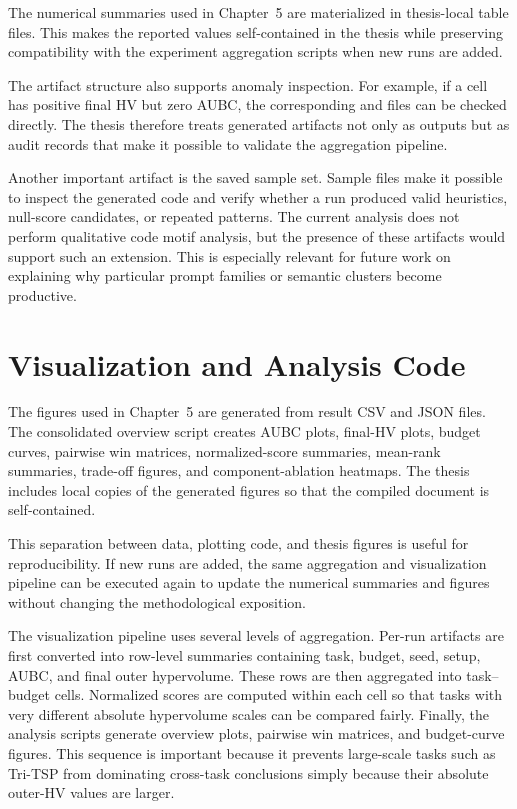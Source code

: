 \documentclass[../main.tex]{subfiles}
\begin{document}
The numerical summaries used in Chapter~5 are materialized in thesis-local table files. This makes the reported values self-contained in the thesis while preserving compatibility with the experiment aggregation scripts when new runs are added.

The artifact structure also supports anomaly inspection. For example, if a cell has positive final HV but zero AUBC, the corresponding  and  files can be checked directly. The thesis therefore treats generated artifacts not only as outputs but as audit records that make it possible to validate the aggregation pipeline.

Another important artifact is the saved sample set. Sample files make it possible to inspect the generated code and verify whether a run produced valid heuristics, null-score candidates, or repeated patterns. The current analysis does not perform qualitative code motif analysis, but the presence of these artifacts would support such an extension. This is especially relevant for future work on explaining why particular prompt families or semantic clusters become productive.

\section{Visualization and Analysis Code}

The figures used in Chapter~5 are generated from result CSV and JSON files. The consolidated overview script creates AUBC plots, final-HV plots, budget curves, pairwise win matrices, normalized-score summaries, mean-rank summaries, trade-off figures, and component-ablation heatmaps. The thesis includes local copies of the generated figures so that the compiled document is self-contained.

This separation between data, plotting code, and thesis figures is useful for reproducibility. If new runs are added, the same aggregation and visualization pipeline can be executed again to update the numerical summaries and figures without changing the methodological exposition.

The visualization pipeline uses several levels of aggregation. Per-run artifacts are first converted into row-level summaries containing task, budget, seed, setup, AUBC, and final outer hypervolume. These rows are then aggregated into task--budget cells. Normalized scores are computed within each cell so that tasks with very different absolute hypervolume scales can be compared fairly. Finally, the analysis scripts generate overview plots, pairwise win matrices, and budget-curve figures. This sequence is important because it prevents large-scale tasks such as Tri-TSP from dominating cross-task conclusions simply because their absolute outer-HV values are larger.
\end{document}
